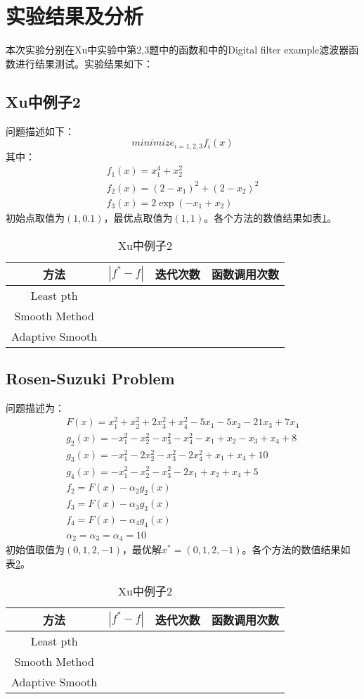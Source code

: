 \documentclass{ctexart}
\begin{document}
\section{实验结果及分析}
本次实验分别在Xu\cite{Xu2001}中实验中第2,3题中的函数和\cite{Charalambous1979}中的Digital filter example滤波器函数进行结果测试。实验结果如下：
\subsection{Xu\cite{Xu2001}中例子2}
问题描述如下：
\[minimize_{i=1,2,3}f_i(x)\]
其中：
\begin{align}
f_1(x) = x_1^4+x_2^2\\
f_2(x) = (2-x_1)^2 + (2-x_2)^2\\
f_3(x) = 2\exp(-x_1+x_2)
\end{align}
初始点取值为$(1,0.1)$，最优点取值为$(1,1)$。各个方法的数值结果如表\ref{tab:xu2}。
\begin{table}[htpb]
	\centering
	\caption{Xu中例子2}
	\label{tab:xu2}
	\begin{tabular}{c c c c}
	\hine
	方法 & $|f^*-f|$ & 迭代次数 & 函数调用次数 \\\hline
	Least pth & & & \\
	Smooth Method & & & \\
	Adaptive Smooth & & & \\
	\hline
	\end{tabular}
\end{table}
\subsection{Rosen-Suzuki Problem}
问题描述为：
\begin{align}
	F(x)=x_1^2+x_2^2+2x_3^2+x_4^2-5x_1-5x_2-21x_3+7x_4\\
	g_2(x)=-x_1^2-x_2^2-x_3^2-x_4^2-x_1+x_2-x_3+x_4+8\\
	g_3(x)=-x_1^2-2x_2^2-x_3^2-2x_4^2+x_1+x_4+10\\
	g_4(x)=-x_1^2-x_2^2-x_3^2-2x_1+x_2+x_4+5\\
	f_2=F(x)-\alpha_2g_2(x)\\
	f_3=F(x)-\alpha_3g_3(x)\\
	f_4=F(x)-\alpha_4g_4(x)\\
	\alpha_2=\alpha_3=\alpha_4=10
\end{align}
初始值取值为$(0,1,2,-1)$，最优解$x^*=(0,1,2,-1)$。各个方法的数值结果如表\ref{tab:rspro}。
\begin{table}[htpb]
	\centering
	\caption{Xu中例子2}
	\label{tab:rspro}
	\begin{tabular}{c c c c}
	\hine
	方法 & $|f^*-f|$ & 迭代次数 & 函数调用次数 \\\hline
	Least pth & & & \\
	Smooth Method & & & \\
	Adaptive Smooth & & & \\
	\hline
	\end{tabular}
\end{table}
\end{document}
